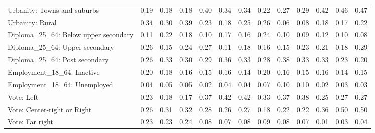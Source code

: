 \begin{tabular}[t]{lllllllllllll}
Urbanity: Towns and suburbs & 0.19 & 0.18 & 0.18 & 0.40 & 0.34 & 0.34 & 0.22 & 0.27 & 0.29 & 0.42 & 0.46 & 0.47\\
Urbanity: Rural & 0.34 & 0.30 & 0.39 & 0.23 & 0.18 & 0.25 & 0.26 & 0.06 & 0.08 & 0.18 & 0.17 & 0.22\\
\addlinespace
Diploma\_25\_64: Below upper secondary & 0.11 & 0.22 & 0.18 & 0.10 & 0.17 & 0.16 & 0.24 & 0.10 & 0.09 & 0.12 & 0.10 & 0.08\\
Diploma\_25\_64: Upper secondary & 0.26 & 0.15 & 0.24 & 0.27 & 0.11 & 0.18 & 0.16 & 0.15 & 0.23 & 0.21 & 0.18 & 0.29\\
Diploma\_25\_64: Post secondary & 0.26 & 0.33 & 0.30 & 0.29 & 0.36 & 0.33 & 0.28 & 0.38 & 0.33 & 0.33 & 0.23 & 0.20\\
\addlinespace
Employment\_18\_64: Inactive & 0.20 & 0.18 & 0.16 & 0.15 & 0.16 & 0.14 & 0.20 & 0.16 & 0.15 & 0.16 & 0.14 & 0.15\\
Employment\_18\_64: Unemployed & 0.04 & 0.05 & 0.05 & 0.02 & 0.04 & 0.04 & 0.07 & 0.10 & 0.10 & 0.02 & 0.03 & 0.03\\
\addlinespace
Vote: Left & 0.23 & 0.18 & 0.17 & 0.37 & 0.42 & 0.42 & 0.33 & 0.37 & 0.38 & 0.25 & 0.27 & 0.27\\
Vote: Center-right or Right & 0.26 & 0.31 & 0.32 & 0.28 & 0.26 & 0.27 & 0.18 & 0.22 & 0.22 & 0.36 & 0.50 & 0.50\\
Vote: Far right & 0.23 & 0.23 & 0.24 & 0.08 & 0.07 & 0.08 & 0.09 & 0.08 & 0.07 & 0.01 & 0.03 & 0.04\\
\bottomrule
\end{tabular}